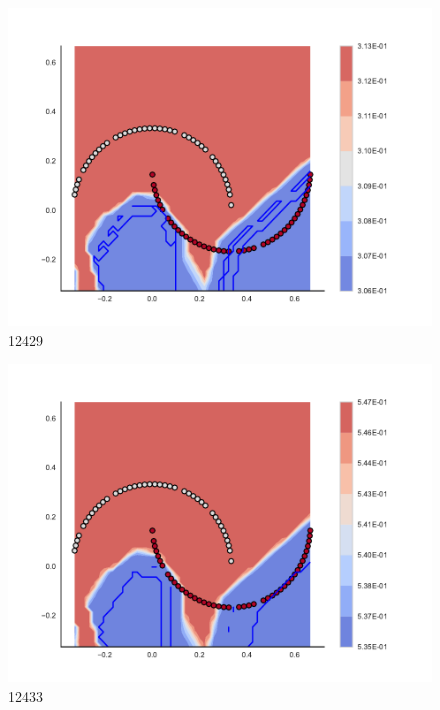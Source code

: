 \begin{subfigure}[b]{0.09\textwidth}
    \includegraphics[clip, trim=2.35cm 1.75cm 4.5cm 0cm,width=\textwidth]{img/convergence/12429.pdf}
    \caption{12429}
    \label{fig:convergence_12429}
\end{subfigure}
%
\begin{subfigure}[b]{0.09\textwidth}
    \includegraphics[clip, trim=2.35cm 1.75cm 4.5cm 0cm,width=\textwidth]{img/convergence/12433.pdf}
    \caption{12433}
    \label{fig:convergence_12433}
\end{subfigure}
%
